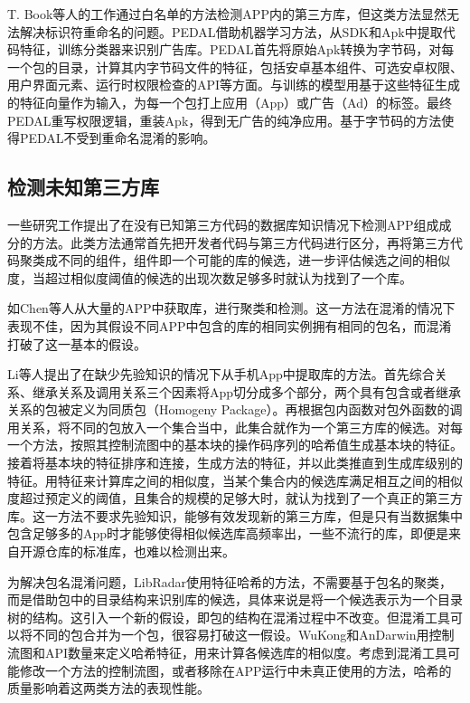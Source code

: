 T. Book等人的工作通过白名单的方法检测APP内的第三方库\cite{book2013longitudinal}，但这类方法显然无法解决标识符重命名的问题。PEDAL\cite{liu2015efficient}借助机器学习方法，从SDK和Apk中提取代码特征，训练分类器来识别广告库。PEDAL首先将原始Apk转换为字节码，对每一个包的目录，计算其内字节码文件的特征，包括安卓基本组件、可选安卓权限、用户界面元素、运行时权限检查的API等方面。与训练的模型用基于这些特征生成的特征向量作为输入，为每一个包打上应用（App）或广告（Ad）的标签。最终PEDAL重写权限逻辑，重装Apk，得到无广告的纯净应用。基于字节码的方法使得PEDAL不受到重命名混淆的影响。


\subsection{检测未知第三方库}

一些研究工作提出了在没有已知第三方代码的数据库知识情况下检测APP组成成分的方法。此类方法通常首先把开发者代码与第三方代码进行区分，再将第三方代码聚类成不同的组件，组件即一个可能的库的候选，进一步评估候选之间的相似度，当超过相似度阈值的候选的出现次数足够多时就认为找到了一个库。

如Chen等人\cite{chen2016following}从大量的APP中获取库，进行聚类和检测。这一方法在混淆的情况下表现不佳，因为其假设不同APP中包含的库的相同实例拥有相同的包名，而混淆打破了这一基本的假设。

Li等人\cite{li2018large}提出了在缺少先验知识的情况下从手机App中提取库的方法。首先综合关系、继承关系及调用关系三个因素将App切分成多个部分，两个具有包含或者继承关系的包被定义为{\kaishu 同质包}（Homogeny Package）。再根据包内函数对包外函数的调用关系，将不同的包放入一个集合当中，此集合就作为一个第三方库的候选。对每一个方法，按照其控制流图中的基本块的操作码序列的哈希值生成基本块的特征。接着将基本块的特征排序和连接，生成方法的特征，并以此类推直到生成库级别的特征。用特征来计算库之间的相似度，当某个集合内的候选库满足相互之间的相似度超过预定义的阈值，且集合的规模的足够大时，就认为找到了一个真正的第三方库。这一方法不要求先验知识，能够有效发现新的第三方库，但是只有当数据集中包含足够多的App时才能够使得相似候选库高频率出，一些不流行的库，即便是来自开源仓库的标准库，也难以检测出来。



为解决包名混淆问题，LibRadar\cite{ma2016libradar}使用特征哈希的方法，不需要基于包名的聚类，而是借助包中的目录结构来识别库的候选，具体来说是将一个候选表示为一个目录树的结构。这引入一个新的假设，即包的结构在混淆过程中不改变。但混淆工具可以将不同的包合并为一个包，很容易打破这一假设。WuKong\cite{wang2015wukong}和AnDarwin\cite{crussell2014andarwin}用控制流图和API数量来定义哈希特征，用来计算各候选库的相似度。考虑到混淆工具可能修改一个方法的控制流图，或者移除在APP运行中未真正使用的方法，哈希的质量影响着这两类方法的表现性能。


